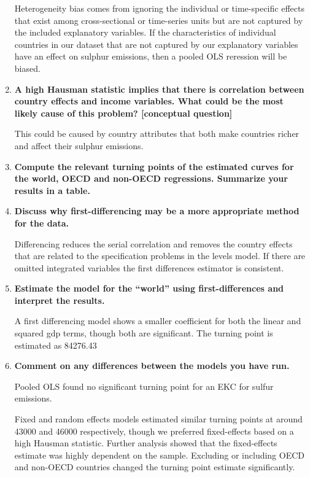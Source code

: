 \documentclass{scrartcl}
\begin{document}
\begin{enumerate}
	Heterogeneity bias comes from ignoring the individual or time-specific effects that exist among cross-sectional or time-series units but are not captured by the included explanatory variables. If the characteristics of individual countries in our dataset that are not captured by our explanatory variables have an effect on sulphur emissions, then a pooled OLS reression will be biased.
	
	\item \textbf{A high Hausman statistic implies that there is correlation between country effects and income variables. What could be the most likely cause of this problem? [conceptual question]}
	
	This could be caused by country attributes that both make countries richer and affect their sulphur emissions.
		
	\item \textbf{Compute the relevant turning points of the estimated curves for the world, OECD and non-OECD regressions. Summarize your results in a table.}
	
	
		
	\item \textbf{Discuss why first-differencing may be a more appropriate method for the data.}
	
	Differencing reduces the serial correlation and removes the country effects that are related to the specification problems in the levels model. If there are omitted integrated variables the first
differences estimator is consistent.
	
	\item \textbf{Estimate the model for the ``world'' using first-differences and interpret the results.}
	
	
	
	A first differencing model shows a smaller coefficient for both the linear and squared gdp terms, though both are significant. The turning point is estimated as 84276.43
	
	\item \textbf{Comment on any differences between the models you have run.}
	
	Pooled OLS found no significant turning point for an EKC for sulfur emissions. 
	
	Fixed and random effects models estimated similar turning points at around 43000 and 46000 respectively, though we preferred fixed-effects based on a high Hausman statistic. Further analysis showed that the fixed-effects estimate was highly dependent on the sample. Excluding or including OECD and non-OECD countries changed the turning point estimate significantly. 
	

\end{enumerate}
\end{document}
